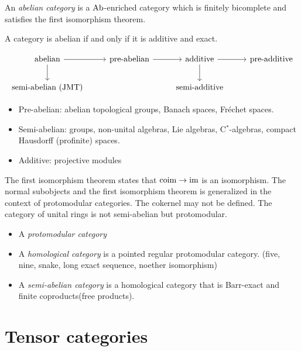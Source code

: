 \documentclass{../../large}
\begin{document}
\begin{prb}
An \emph{abelian category} is a $\mathrm{Ab}$-enriched category which is finitely bicomplete and satisfies the first isomorphism theorem.
\begin{parts}
\item A category is abelian if and only if it is additive and exact.
\end{parts}
\end{prb}


\begin{prb}
\end{prb}


\[\begin{tikzcd}[math mode=false]
abelian\ar{r}\ar{d} & pre-abelian \ar{r} & additive \ar{r}\ar{d} & pre-additive\\
semi-abelian (JMT) && semi-additive & \,
\end{tikzcd}\]
\begin{itemize}
\item Pre-abelian: abelian topological groups, Banach spaces, Fr\'echet spaces.
\item Semi-abelian: groups, non-unital algebras, Lie algebras, C$^*$-algebras, compact Hausdorff (profinite) spaces.
\item Additive: projective modules
\end{itemize}





The first isomorphism theorem states that $\operatorname{coim}\to\operatorname{im}$ is an isomorphism.
The normal subobjects and the first isomorphism theorem is generalized in the context of protomodular categories.
The cokernel may not be defined.
The category of unital rings is not semi-abelian but protomodular.
\begin{itemize}
\item A \emph{protomodular category}
\item A \emph{homological category} is a pointed regular protomodular category. (five, nine, snake, long exact sequence, noether isomorphism)
\item A \emph{semi-abelian category} is a homological category that is Barr-exact and finite coproducts(free products).
\end{itemize}








\chapter{Tensor categories}
\end{document}
